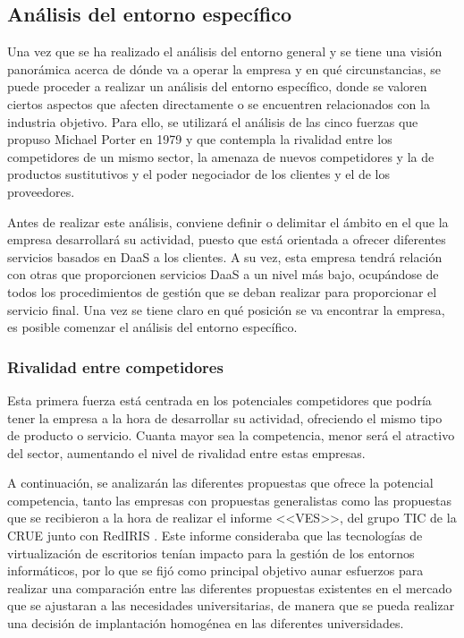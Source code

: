 \clearpage

\subsection{Análisis del entorno específico}
Una vez que se ha realizado el análisis del entorno general y se tiene una visión panorámica acerca de dónde va a operar la empresa y en qué circunstancias, se puede proceder a realizar un análisis del entorno específico, donde se valoren ciertos aspectos que afecten directamente o se encuentren relacionados con la industria objetivo. Para ello, se utilizará el análisis de las cinco fuerzas que propuso Michael Porter en 1979 y que contempla la rivalidad entre los competidores de un mismo sector, la amenaza de nuevos competidores y la de productos sustitutivos y el poder negociador de los clientes y el de los proveedores. 

Antes de realizar este análisis, conviene definir o delimitar el ámbito en el que la empresa desarrollará su actividad, puesto que está orientada a ofrecer diferentes servicios basados en \acs{DaaS} a los clientes. A su vez, esta empresa tendrá relación con otras que proporcionen servicios \acs{DaaS} a un nivel más bajo, ocupándose de todos los procedimientos de gestión que se deban realizar para proporcionar el servicio final. Una vez se tiene claro en qué posición se va encontrar la empresa, es posible comenzar el análisis del entorno específico.

\subsubsection{Rivalidad entre competidores}
Esta primera fuerza está centrada en los potenciales competidores que podría tener la empresa a la hora de desarrollar su actividad, ofreciendo el mismo tipo de producto o servicio. Cuanta mayor sea la competencia, menor será el atractivo del sector, aumentando el nivel de rivalidad entre estas empresas.

A continuación, se analizarán las diferentes propuestas que ofrece la potencial competencia, tanto las empresas con propuestas generalistas como las propuestas que se recibieron a la hora de realizar el informe <<\acf{VES}>>, del grupo \acs{TIC} de la \acf{CRUE} junto con RedIRIS \cite{rediris2015}. Este informe consideraba que las tecnologías de virtualización de escritorios tenían impacto para la gestión de los entornos informáticos, por lo que se fijó como principal objetivo aunar esfuerzos para realizar una comparación entre las diferentes propuestas existentes en el mercado que se ajustaran a las necesidades universitarias, de manera que se pueda realizar una decisión de implantación homogénea en las diferentes universidades.

